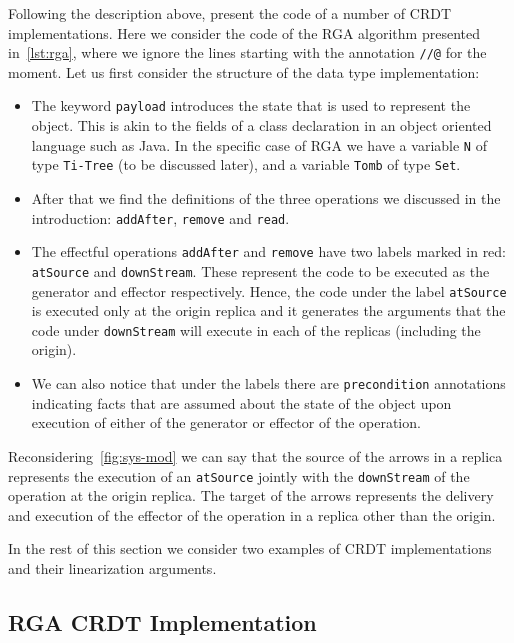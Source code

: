 Following the description above, \citet{ShapiroPBZ11} present the code
of a number of CRDT implementations.
%
Here we consider the code of the RGA algorithm presented
in~\autoref{lst:rga}, where we ignore the lines starting with the
annotation \lstinline|//@| for the moment.
%
Let us first consider the structure of the data type implementation:
\begin{itemize}
\item The keyword \lstinline|payload| introduces the state that is
  used to represent the object. This is akin to the fields of a class
  declaration in an object oriented language such as Java. In the specific
  case of RGA we have a variable \lstinline|N| of type
  \lstinline|Ti-Tree| (to be discussed later), and a variable
  \lstinline|Tomb| of type \lstinline|Set|.
\item After that we find the definitions of the three operations we
  discussed in the introduction: \lstinline|addAfter|,
  \lstinline|remove| and \lstinline|read|.
\item The effectful operations \lstinline|addAfter| and
  \lstinline|remove| have two labels marked in red:
  \lstinline|atSource| and \lstinline|downStream|.
  These represent the code to be executed as the generator and
  effector respectively. Hence, the code under the label
  \lstinline|atSource| is executed only at the origin replica and it
  generates the arguments that the code under \lstinline|downStream|
  will execute in each of the replicas (including the origin).
\item We can also notice that under the labels there are
  \lstinline|precondition| annotations indicating facts that are
  assumed about the state of the object upon execution of either of
  the generator or effector of the operation.
\end{itemize}
Reconsidering~\autoref{fig:sys-mod} we can say that the
source of the arrows in a replica represents the execution of an
\lstinline|atSource| jointly with the \lstinline|downStream| of the
operation at the origin replica.
%
The target of the arrows represents the delivery and execution of the
effector of the operation in a replica other than the origin.


In the rest of this section we consider two examples of CRDT
implementations and their linearization arguments.

\subsection{RGA CRDT Implementation}
\label{sec:rga-crdt-impl}

